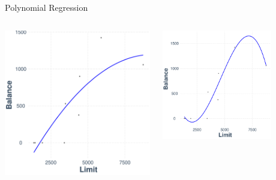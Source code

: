 \documentclass[11pt,compress,t,notes=noshow, xcolor=table]{beamer}
\begin{document}
\begin{vbframe}{Polynomial Regression}
\begin{columns}
\begin{column}{0.3\textwidth}
  \includegraphics[width = \textwidth]{slides/supervised-regression/figure/nutshell-regression-poly-plot-2.pdf}
\end{column}
\begin{column}{0.4\textwidth} 
\tiny {}
   \includegraphics[width = 0.75\textwidth]{slides/supervised-regression/figure/nutshell-regression-poly-plot-3.pdf}
\end{column}
\end{columns}


\end{vbframe}

\endlecture
\end{document}
